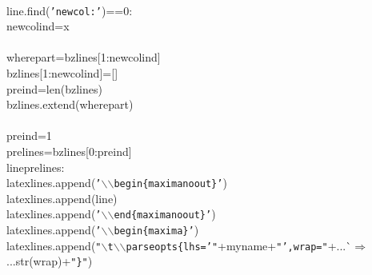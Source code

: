 {{\begin{tabbing}
\\
\hspace{5pt}line.find({\texttt{{'}newcol:{'}}})==0:
\\
\hspace{100pt}newcolind=x
\\
\\
\hspace{60pt}wherepart=bzlines{[}1:newcolind{]}
\\
\hspace{60pt}bzlines{[}1:newcolind{]}={[}{]}
\\
\hspace{60pt}preind=len(bzlines)
\\
\hspace{60pt}bzlines.extend(wherepart)
\\
\\
\hspace{60pt}preind=1
\\
\hspace{40pt}prelines=bzlines{[}0:preind{]}
\\
\hspace{5pt}line\hspace{5pt}prelines:
\\
\hspace{60pt}latexlines.append({\texttt{{'}$\backslash$$\backslash$begin\{maxima\dash{}noout\}{'}}})
\\
\hspace{60pt}latexlines.append(line)
\\
\hspace{60pt}latexlines.append({\texttt{{'}$\backslash$$\backslash$end\{maxima\dash{}noout\}{'}}})
\\
\hspace{40pt}latexlines.append({\texttt{{'}$\backslash$$\backslash$begin\{maxima\}{'}}})
\\
\hspace{40pt}latexlines.append({\texttt{\string"$\backslash$t$\backslash$$\backslash$parseopts\{lhs={'}\string"}}+myname+{\texttt{\string"{'},wrap=\string"}}+{}...\`$\Rightarrow$\\
...{}str(wrap)+{\texttt{\string"\}\string"}})
\\

\end{tabbing}}}
